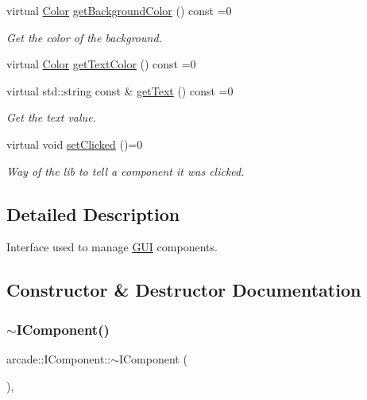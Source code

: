\begin{DoxyCompactItemize}
virtual \hyperlink{unionarcade_1_1_color}{Color} \hyperlink{classarcade_1_1_i_component_a99301c61be2a21ef8a274727ba781a00}{get\+Background\+Color} () const =0
\begin{DoxyCompactList}\small\item\em Get the color of the background. \end{DoxyCompactList}\item 
virtual \hyperlink{unionarcade_1_1_color}{Color} \hyperlink{classarcade_1_1_i_component_a9d4c57ad7c49e39ef0269f10fdc14807}{get\+Text\+Color} () const =0
\item 
virtual std\+::string const  \& \hyperlink{classarcade_1_1_i_component_a7c09ef60e3d41d4afedf2be77fe880a7}{get\+Text} () const =0
\begin{DoxyCompactList}\small\item\em Get the text value. \end{DoxyCompactList}\item 
virtual void \hyperlink{classarcade_1_1_i_component_ae0cd9b58ad0b127c671a5d8f92d9c25f}{set\+Clicked} ()=0
\begin{DoxyCompactList}\small\item\em Way of the lib to tell a component it was clicked. \end{DoxyCompactList}\end{DoxyCompactItemize}


\subsection{Detailed Description}
Interface used to manage \hyperlink{classarcade_1_1_g_u_i}{G\+UI} components. 

\subsection{Constructor \& Destructor Documentation}
\mbox{\label{classarcade_1_1_i_component_a1d4ec4990f66b23a90c4da6b00b3a32f}} 
\subsubsection{\texorpdfstring{$\sim$\+I\+Component()}{~IComponent()}}
{\footnotesize\ttfamily arcade\+::\+I\+Component\+::$\sim$\+I\+Component (\begin{DoxyParamCaption}{ }\end{DoxyParamCaption})\hspace{0.3cm}{\ttfamily [inline]}, {\ttfamily [virtual]}}



